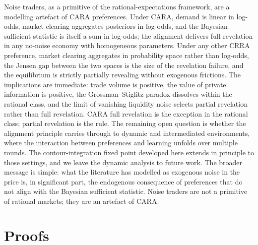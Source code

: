 \documentclass[12pt,letterpaper]{article}
\theoremstyle{definition}
\theoremstyle{remark}
\newcommand{\1}{\mathbf{1}}
\begin{document}
Noise traders, as a primitive of the rational-expectations framework, are
a modelling artefact of CARA preferences. Under CARA, demand is linear in
log-odds, market clearing aggregates posteriors in log-odds, and the
Bayesian sufficient statistic is itself a sum in log-odds; the alignment
delivers full revelation in any no-noise economy with homogeneous
parameters. Under any other CRRA preference, market clearing aggregates
in probability space rather than log-odds, the Jensen gap between the two
spaces is the size of the revelation failure, and the equilibrium is
strictly partially revealing without exogenous frictions. The implications
are immediate: trade volume is positive, the value of private information
is positive, the Grossman--Stiglitz paradox dissolves within the rational
class, and the limit of vanishing liquidity noise selects partial
revelation rather than full revelation. CARA full revelation is the
exception in the rational class; partial revelation is the rule. The
remaining open question is whether the alignment principle carries
through to dynamic and intermediated environments, where the interaction
between preferences and learning unfolds over multiple rounds. The
contour-integration fixed point developed here extends in principle to
those settings, and we leave the dynamic analysis to future work. The
broader message is simple: what the literature has modelled as exogenous
noise in the price is, in significant part, the endogenous consequence
of preferences that do not align with the Bayesian sufficient statistic.
Noise traders are not a primitive of rational markets; they are an
artefact of CARA.




\appendix

\section{Proofs}\label{app:proofs}
\end{document}
